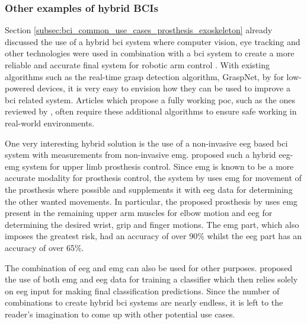
\subsubsection{Other examples of hybrid BCIs}
\label{subsubsec:bci_common_use_cases_improving_existing_system_smart_home}

Section \ref{subsec:bci_common_use_cases_prosthesis_exoskeleton} already discussed the use of a hybrid \gls{bci} system where computer vision, eye tracking and other technologies were used in combination with a \gls{bci} system to create a more reliable and accurate final system for robotic arm control \citep[as proposed by][]{bci_mi_robotic_arm_collision_avoidance}.
With existing algorithms such as the real-time grasp detection algorithm, GraspNet, by \citet{graspnet} for low-powered devices, it is very easy to envision how they can be used to improve a \gls{bci} related system.
Articles which propose a fully working \gls{poc}, such as the ones reviewed by \citet{bci_review_arnau}, often require these additional algorithms to ensure safe working in real-world environments.

One very interesting hybrid solution is the use of a non-invasive \gls{eeg} based \gls{bci} system with measurements from non-invasive \gls{emg}.
 proposed such a hybrid \gls{eeg}-\gls{emg} system for upper limb prosthesis control.
Since \gls{emg} is known to be a more accurate modality for prosthesis control, the system by \citet{hybrid_eeg_emg_prosthesis} uses \gls{emg} for movement of the prosthesis where possible and supplements it with \gls{eeg} data for determining the other wanted movements.
In particular, the proposed prosthesis by \citet{hybrid_eeg_emg_prosthesis} uses \gls{emg} present in the remaining upper arm muscles for elbow motion and \gls{eeg} for determining the desired wrist, grip and finger
motions.
The \gls{emg} part, which also imposes the greatest risk, had an accuracy of over 90\% whilst the \gls{eeg} part has an accuracy of over 65\%.

The combination of \gls{eeg} and \gls{emg} can also be used for other purposes.
\citet{thesis_arnau} proposed the use of both \gls{emg} and \gls{eeg} data for training a classifier which then relies solely on \gls{eeg} input for making final classification predictions.
Since the number of combinations to create hybrid \gls{bci} systems are nearly endless, it is left to the reader's imagination to come up with other potential use cases.

